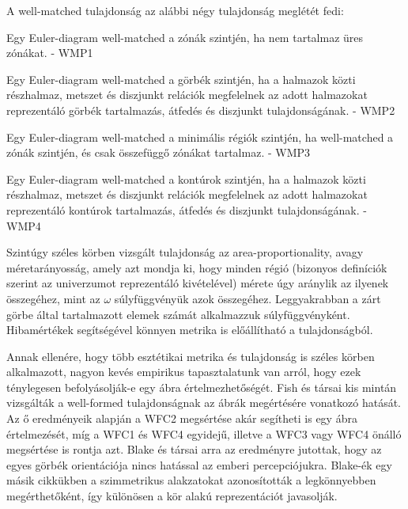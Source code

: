 A well-matched tulajdonság az alábbi négy tulajdonság meglétét fedi:

\begin{compactenum}
	\item Egy Euler-diagram well-matched a zónák szintjén, ha nem tartalmaz üres zónákat. - WMP1
	\item Egy Euler-diagram well-matched a görbék szintjén, ha a halmazok közti részhalmaz, metszet és diszjunkt relációk megfelelnek az adott halmazokat reprezentáló görbék tartalmazás, átfedés és diszjunkt tulajdonságának. - WMP2
	\item Egy Euler-diagram well-matched a minimális régiók szintjén, ha well-matched a zónák szintjén, és csak összefüggő zónákat tartalmaz. - WMP3
	\item Egy Euler-diagram well-matched a kontúrok szintjén, ha a halmazok közti részhalmaz, metszet és diszjunkt relációk megfelelnek az adott halmazokat reprezentáló kontúrok tartalmazás, átfedés és diszjunkt tulajdonságának. - WMP4\\
\end{compactenum}

Szintúgy széles körben vizsgált tulajdonság az area-proportionality, avagy méretarányosság\cite{euler_with_circles, area_proportional_phd, drawing_area_proportional, general_area_proportional}, amely azt mondja ki, hogy minden régió (bizonyos definíciók szerint az univerzumot reprezentáló kivételével) mérete úgy aránylik az ilyenek összegéhez, mint az $\omega$ súlyfüggvényük azok összegéhez. Leggyakrabban a zárt görbe által tartalmazott elemek számát alkalmazzuk súlyfüggvényként. Hibamértékek segítségével könnyen metrika is előállítható a tulajdonságból.

Annak ellenére, hogy több esztétikai metrika és tulajdonság is széles körben alkalmazott, nagyon kevés empirikus tapasztalatunk van arról, hogy ezek ténylegesen befolyásolják-e egy ábra értelmezhetőségét. Fish és társai kis mintán vizsgálták\cite{euler_comprehension} a well-formed tulajdonságnak az ábrák megértésére vonatkozó hatását. Az ő eredményeik alapján a WFC2 megsértése akár segítheti is egy ábra értelmezését, míg a WFC1 és WFC4 egyidejű, illetve a WFC3 vagy WFC4 önálló megsértése is rontja azt. Blake és társai\cite{orientation_comprehension} arra az eredményre jutottak, hogy az egyes görbék orientációja nincs hatással az emberi percepciójukra. Blake-ék egy másik cikkükben\cite{shape_comprehension} a szimmetrikus alakzatokat azonosították a legkönnyebben megérthetőként, így különösen a kör alakú reprezentációt javasolják.


